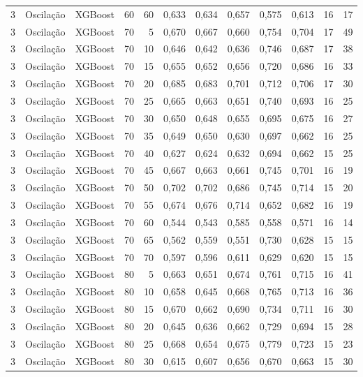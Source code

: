 \begin{longtable}{@{}rllrrrrrrrrr@{}}
3 & Oscilação & XGBoost & 60 & 60 & 0,633 & 0,634 & 0,657 & 0,575 & 0,613 & 16 & 17 \\
3 & Oscilação & XGBoost & 70 & 5 & 0,670 & 0,667 & 0,660 & 0,754 & 0,704 & 17 & 49 \\
3 & Oscilação & XGBoost & 70 & 10 & 0,646 & 0,642 & 0,636 & 0,746 & 0,687 & 17 & 38 \\
3 & Oscilação & XGBoost & 70 & 15 & 0,655 & 0,652 & 0,656 & 0,720 & 0,686 & 16 & 33 \\
3 & Oscilação & XGBoost & 70 & 20 & 0,685 & 0,683 & 0,701 & 0,712 & 0,706 & 17 & 30 \\
3 & Oscilação & XGBoost & 70 & 25 & 0,665 & 0,663 & 0,651 & 0,740 & 0,693 & 16 & 25 \\
3 & Oscilação & XGBoost & 70 & 30 & 0,650 & 0,648 & 0,655 & 0,695 & 0,675 & 16 & 27 \\
3 & Oscilação & XGBoost & 70 & 35 & 0,649 & 0,650 & 0,630 & 0,697 & 0,662 & 16 & 25 \\
3 & Oscilação & XGBoost & 70 & 40 & 0,627 & 0,624 & 0,632 & 0,694 & 0,662 & 15 & 25 \\
3 & Oscilação & XGBoost & 70 & 45 & 0,667 & 0,663 & 0,661 & 0,745 & 0,701 & 16 & 19 \\
3 & Oscilação & XGBoost & 70 & 50 & 0,702 & 0,702 & 0,686 & 0,745 & 0,714 & 15 & 20 \\
3 & Oscilação & XGBoost & 70 & 55 & 0,674 & 0,676 & 0,714 & 0,652 & 0,682 & 16 & 19 \\
3 & Oscilação & XGBoost & 70 & 60 & 0,544 & 0,543 & 0,585 & 0,558 & 0,571 & 16 & 14 \\
3 & Oscilação & XGBoost & 70 & 65 & 0,562 & 0,559 & 0,551 & 0,730 & 0,628 & 15 & 15 \\
3 & Oscilação & XGBoost & 70 & 70 & 0,597 & 0,596 & 0,611 & 0,629 & 0,620 & 15 & 15 \\
3 & Oscilação & XGBoost & 80 & 5 & 0,663 & 0,651 & 0,674 & 0,761 & 0,715 & 16 & 41 \\
3 & Oscilação & XGBoost & 80 & 10 & 0,658 & 0,645 & 0,668 & 0,765 & 0,713 & 16 & 36 \\
3 & Oscilação & XGBoost & 80 & 15 & 0,670 & 0,662 & 0,690 & 0,734 & 0,711 & 16 & 30 \\
3 & Oscilação & XGBoost & 80 & 20 & 0,645 & 0,636 & 0,662 & 0,729 & 0,694 & 15 & 28 \\
3 & Oscilação & XGBoost & 80 & 25 & 0,668 & 0,654 & 0,675 & 0,779 & 0,723 & 15 & 23 \\
3 & Oscilação & XGBoost & 80 & 30 & 0,615 & 0,607 & 0,656 & 0,670 & 0,663 & 15 & 30 \\

\end{longtable}

